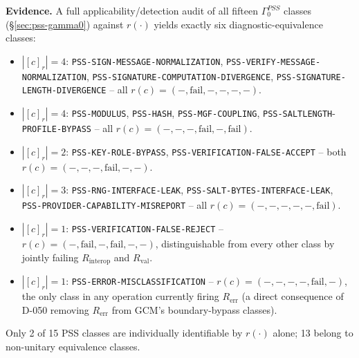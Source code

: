 \documentclass[11pt,a4paper]{article}
\begin{document}
\textbf{Evidence.} A full applicability/detection audit of all fifteen $\Gamma_0^{PSS}$ classes (\S\ref{sec:pss-gamma0}) against $r(\cdot)$ yields exactly six diagnostic-equivalence classes:
\begin{itemize}
\item $|[c]_r|=4$: \texttt{PSS-SIGN-MESSAGE-NORMALIZATION}, \texttt{PSS-VERIFY-MESSAGE-NORMALIZATION}, \texttt{PSS-SIGNATURE-COMPUTATION-DIVERGENCE}, \texttt{PSS-SIGNATURE-LENGTH-DIVERGENCE} -- all $r(c)=(-,\text{fail},-,-,-,-)$.
\item $|[c]_r|=4$: \texttt{PSS-MODULUS}, \texttt{PSS-HASH}, \texttt{PSS-MGF-COUPLING}, \texttt{PSS-SALTLENGTH}-\texttt{PROFILE-BYPASS} -- all $r(c)=(-,-,-,\text{fail},-,\text{fail})$.
\item $|[c]_r|=2$: \texttt{PSS-KEY-ROLE-BYPASS}, \texttt{PSS-VERIFICATION-FALSE-ACCEPT} -- both $r(c)=(-,-,-,\text{fail},-,-)$.
\item $|[c]_r|=3$: \texttt{PSS-RNG-INTERFACE-LEAK}, \texttt{PSS-SALT-BYTES-INTERFACE-LEAK}, \texttt{PSS-PROVIDER-CAPABILITY-MISREPORT} -- all $r(c)=(-,-,-,-,-,\text{fail})$.
\item $|[c]_r|=1$: \texttt{PSS-VERIFICATION-FALSE-REJECT} -- $r(c)=(-,\text{fail},-,\text{fail},-,-)$, distinguishable from every other class by jointly failing $R_{\text{interop}}$ and $R_{\text{val}}$.
\item $|[c]_r|=1$: \texttt{PSS-ERROR-MISCLASSIFICATION} -- $r(c)=(-,-,-,-,\text{fail},-)$, the only class in any operation currently firing $R_{\text{err}}$ (a direct consequence of D-050 removing $R_{\text{err}}$ from GCM's boundary-bypass classes).
\end{itemize}
Only 2 of 15 PSS classes are individually identifiable by $r(\cdot)$ alone; 13 belong to non-unitary equivalence classes.
\end{document}
